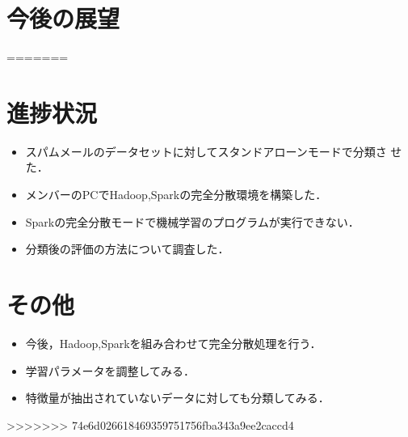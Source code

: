 \documentclass[a4paper,12pt]{jarticle}
\begin{document}
\section{今後の展望}
=======
\section{進捗状況}
\begin{itemize}
 \item スパムメールのデータセットに対してスタンドアローンモードで分類さ
	   せた．
 \item メンバーのPCでHadoop,Sparkの完全分散環境を構築した．
 \item Sparkの完全分散モードで機械学習のプログラムが実行できない．
 \item 分類後の評価の方法について調査した．
\end{itemize}

\section{その他}
\begin{itemize}
 \item 今後，Hadoop,Sparkを組み合わせて完全分散処理を行う．
 \item 学習パラメータを調整してみる．
 \item 特徴量が抽出されていないデータに対しても分類してみる．
\end{itemize}
>>>>>>> 74e6d026618469359751756fba343a9ee2caccd4
\end{document}

